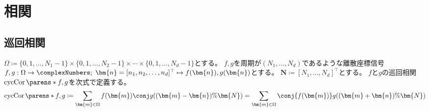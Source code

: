 \part{相関}
    \chapter{巡回相関}
        $\Omega \coloneq \{0,1,\dots,N_1-1\}\times\{0,1,\dots,N_2-1\}\times\cdots\times\{0,1,\dots,N_d-1\}$とする。
        $f,g$を周期が$(N_1,\dots,N_d)$であるような離散座標信号$f,g: \Omega\to\complexNumbers;\;\bm{n} = [n_1,n_2,\dots,n_d]^\top \mapsto f(\bm{n}),g(\bm{n})$とする。
        $\bm{N} \coloneq [N_1,\dots,N_d]^\top$とする。
        $f$と$g$の巡回相関$\cycCorrel\parens*{f,g}$を次式で定義する。
        \[ \cycCorrel\parens*{f,g} \coloneq \sum_{\bm{m}\in\Omega} f(\bm{m})\conj{g((\bm{m}-\bm{n})\%\bm{N})} = \sum_{\bm{m}\in\Omega} \conj{f(\bm{m})}g((\bm{m}+\bm{n})\%\bm{N}) \]